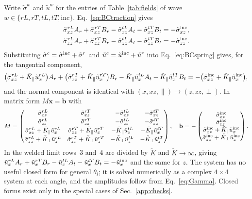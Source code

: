 \documentclass[11pt,a4paper]{article}
\begin{document}
Write $\tilde\sigma^{w}$ and $\tilde u^{w}$ for the entries of Table~\ref{tab:fields} of wave
$w\in\{rL,rT,tL,tT,\mathrm{inc}\}$. Eq.~\eqref{eq:BCtraction} gives
\begin{align}
  \tilde\sigma_{xz}^{rL}A_r+\tilde\sigma_{xz}^{rT}B_r-\tilde\sigma_{xz}^{tL}A_t-\tilde\sigma_{xz}^{tT}B_t
   &=-\tilde\sigma_{xz}^{\rm inc},\\
  \tilde\sigma_{zz}^{rL}A_r+\tilde\sigma_{zz}^{rT}B_r-\tilde\sigma_{zz}^{tL}A_t-\tilde\sigma_{zz}^{tT}B_t
   &=-\tilde\sigma_{zz}^{\rm inc}.
\end{align}
Substituting $\tilde\sigma^c=\tilde\sigma^{\rm inc}+\tilde\sigma^{r}$ and
$\tilde u^c=\tilde u^{\rm inc}+\tilde u^{r}$ into Eq.~\eqref{eq:BCspring} gives, for the
tangential component,
\begin{equation}
  \big(\tilde\sigma_{xz}^{rL}+\tilde K_\parallel\tilde u_x^{rL}\big)A_r
  +\big(\tilde\sigma_{xz}^{rT}+\tilde K_\parallel\tilde u_x^{rT}\big)B_r
  -\tilde K_\parallel\tilde u_x^{tL}A_t-\tilde K_\parallel\tilde u_x^{tT}B_t
  =-\big(\tilde\sigma_{xz}^{\rm inc}+\tilde K_\parallel\tilde u_x^{\rm inc}\big),
\end{equation}
and the normal component is identical with $(x,xz,\parallel)\to(z,zz,\perp)$. In matrix form
$M\mathbf x=\mathbf b$ with
\begin{equation}
  M=\begin{pmatrix}
  \tilde\sigma_{xz}^{rL} & \tilde\sigma_{xz}^{rT} & -\tilde\sigma_{xz}^{tL} & -\tilde\sigma_{xz}^{tT}\\[2pt]
  \tilde\sigma_{zz}^{rL} & \tilde\sigma_{zz}^{rT} & -\tilde\sigma_{zz}^{tL} & -\tilde\sigma_{zz}^{tT}\\[2pt]
  \tilde\sigma_{xz}^{rL}+\tilde K_\parallel\tilde u_x^{rL} & \tilde\sigma_{xz}^{rT}+\tilde K_\parallel\tilde u_x^{rT} &
   -\tilde K_\parallel\tilde u_x^{tL} & -\tilde K_\parallel\tilde u_x^{tT}\\[2pt]
  \tilde\sigma_{zz}^{rL}+\tilde K_\perp\tilde u_z^{rL} & \tilde\sigma_{zz}^{rT}+\tilde K_\perp\tilde u_z^{rT} &
   -\tilde K_\perp\tilde u_z^{tL} & -\tilde K_\perp\tilde u_z^{tT}
  \end{pmatrix},\quad
  \mathbf b=-\begin{pmatrix}
  \tilde\sigma_{xz}^{\rm inc}\\ \tilde\sigma_{zz}^{\rm inc}\\
  \tilde\sigma_{xz}^{\rm inc}+\tilde K_\parallel\tilde u_x^{\rm inc}\\
  \tilde\sigma_{zz}^{\rm inc}+\tilde K_\perp\tilde u_z^{\rm inc}
  \end{pmatrix}.
\end{equation}
In the welded limit rows~3 and~4 are divided by $\tilde K$ and $\tilde K\to\infty$, giving
$\tilde u^{rL}_xA_r+\tilde u^{rT}_xB_r-\tilde u^{tL}_xA_t-\tilde u^{tT}_xB_t=-\tilde u^{\rm inc}_x$
and the same for $z$. The system has no useful closed form for general $\theta_i$; it is
solved numerically as a complex $4\times4$ system at each angle, and the amplitudes follow
from Eq.~\eqref{eq:Gamma}. Closed forms exist only in the special cases of
Sec.~\ref{app:checks}.
\end{document}
